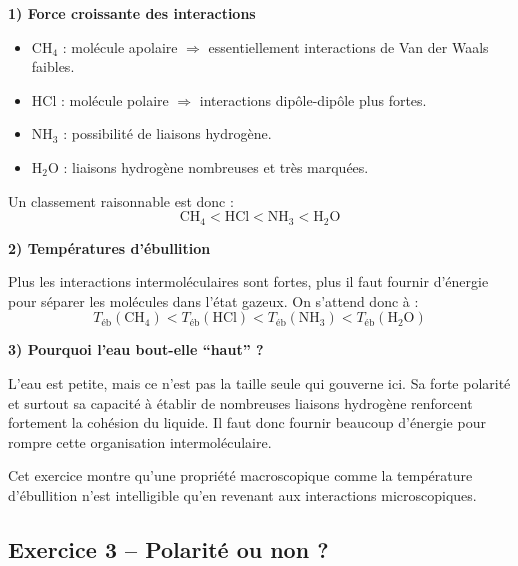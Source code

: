 \documentclass[11pt,a4paper]{article}
\begin{document}
\begin{corrigebox}
\textbf{1) Force croissante des interactions}

\begin{itemize}
    \item \(\mathrm{CH_4}\) : molécule apolaire \(\Rightarrow\) essentiellement interactions de Van der Waals faibles.
    \item \(\mathrm{HCl}\) : molécule polaire \(\Rightarrow\) interactions dipôle-dipôle plus fortes.
    \item \(\mathrm{NH_3}\) : possibilité de liaisons hydrogène.
    \item \(\mathrm{H_2O}\) : liaisons hydrogène nombreuses et très marquées.
\end{itemize}

Un classement raisonnable est donc :
\[
\mathrm{CH_4} < \mathrm{HCl} < \mathrm{NH_3} < \mathrm{H_2O}
\]

\textbf{2) Températures d'ébullition}

Plus les interactions intermoléculaires sont fortes, plus il faut fournir d'énergie pour séparer les molécules dans l'état gazeux.  
On s'attend donc à :
\[
T_{\text{éb}}(\mathrm{CH_4}) < T_{\text{éb}}(\mathrm{HCl}) < T_{\text{éb}}(\mathrm{NH_3}) < T_{\text{éb}}(\mathrm{H_2O})
\]

\textbf{3) Pourquoi l'eau bout-elle ``haut'' ?}

L'eau est petite, mais ce n'est pas la taille seule qui gouverne ici.  
Sa forte polarité et surtout sa capacité à établir de nombreuses liaisons hydrogène renforcent fortement la cohésion du liquide.  
Il faut donc fournir beaucoup d'énergie pour rompre cette organisation intermoléculaire.

\begin{ideebox}
Cet exercice montre qu'une propriété macroscopique comme la température d'ébullition n'est intelligible qu'en revenant aux interactions microscopiques.
\end{ideebox}
\end{corrigebox}

\subsection{Exercice 3 -- Polarité ou non ?}
\end{document}
